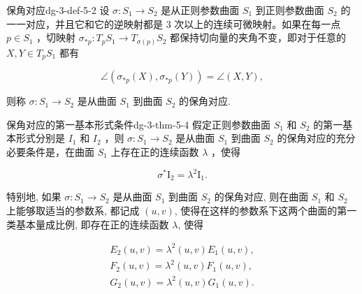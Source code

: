 \begin{definition}{保角对应}{dg-3-def-5-2}
设  \(\sigma: S_{1} \rightarrow S_{2}\)  是从正则参数曲面  \(S_{1}\)  到正则参数曲面  \(S_{2}\)  的一一对应，并且它和它的逆映射都是 3 次以上的连续可微映射。如果在每一点  \(p \in S_{1}\) ，切映射  \(\sigma_{*p}: T_{p}S_{1} \rightarrow T_{\sigma(p)}S_{2}\)  都保持切向量的夹角不变，即对于任意的  \(X, Y \in T_{p}S_{1}\)  都有\par

\begin{equation*}
\angle (\sigma_ {* p} (X), \sigma_ {* p} (Y)) = \angle (X, Y),
\end{equation*}

则称 \(\sigma : S_1 \to S_2\) 是从曲面 \(S_1\) 到曲面 \(S_2\) 的保角对应.
\end{definition}

\begin{theorem}{保角对应的第一基本形式条件}{dg-3-thm-5-4}
假定正则参数曲面  \(S_{1}\)  和  \(S_{2}\)  的第一基本形式分别是  \(I_{1}\)  和  \(I_{2}\) ，则  \(\sigma: S_{1} \rightarrow S_{2}\)  是从曲面  \(S_{1}\)  到曲面  \(S_{2}\)  的保角对应的充分必要条件是，在曲面  \(S_{1}\)  上存在正的连续函数  \(\lambda\) ，使得\par

\begin{equation*}
\sigma^ {*} \mathrm{I} _ {2} = \lambda^ {2} \mathrm{I} _ {1}.
\end{equation*}

特别地, 如果 \(\sigma: S_{1} \rightarrow S_{2}\) 是从曲面 \(S_{1}\) 到曲面 \(S_{2}\) 的保角对应, 则在曲面 \(S_{1}\) 和 \(S_{2}\) 上能够取适当的参数系, 都记成 \((u, v)\), 使得在这样的参数系下这两个曲面的第一类基本量成比例, 即存在正的连续函数 \(\lambda\), 使得\par

\begin{equation*}
\begin{array}{l} E _ {2} (u, v) = \lambda^ {2} (u, v) E _ {1} (u, v), \\ F _ {2} (u, v) = \lambda^ {2} (u, v) F _ {1} (u, v), \\ G _ {2} (u, v) = \lambda^ {2} (u, v) G _ {1} (u, v). \end{array}
\end{equation*}
\end{theorem}

